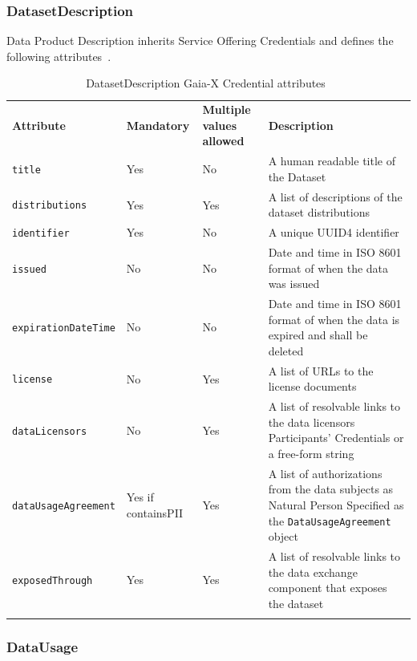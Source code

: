 \subsubsection{DatasetDescription}

Data Product Description inherits Service Offering Credentials and defines the following attributes~\cite{gaiax_data_exchange_document}.

\begin{longtable}{ |p{4cm}|p{2cm}|p{2cm}|p{7cm}| }
    \hhline{----}
    \textbf{Attribute} & \textbf{Mandatory} & \textbf{Multiple values allowed} & \textbf{Description}\\
    \hhline{----}
    \texttt{title} & Yes & No & A human readable title of the Dataset\\
    \hhline{----}
    \texttt{distributions} & Yes & Yes & A list of descriptions of the dataset distributions\\
    \hhline{----}
    \texttt{identifier} & Yes & No & A unique UUID4 identifier\\
    \hhline{----}
    \texttt{issued} & No & No & Date and time in ISO 8601 format of when the data was issued\\
    \hhline{----}
    \texttt{expirationDateTime} & No & No & Date and time in ISO 8601 format of when the data is expired and shall be deleted\\
    \hhline{----}
    \texttt{license} & No & Yes & A list of URLs to the license documents\\
    \hhline{----}
    \texttt{dataLicensors} & No & Yes & A list of resolvable links to the data licensors Participants' Credentials or a free-form string\\
    \hhline{----}
    \texttt{dataUsageAgreement} & Yes if containsPII & Yes & A list of authorizations from the data subjects as Natural Person
    Specified as the \texttt{DataUsageAgreement} object\\
    \hhline{----}
    \texttt{exposedThrough} & Yes & Yes & A list of resolvable links to the data exchange component that exposes the dataset\\
    \hhline{----}
    \caption{DatasetDescription Gaia-X Credential attributes~\cite{gaiax_data_exchange_document}}
    \label{tab:dataset_description}
\end{longtable}

\subsubsection{DataUsage}

